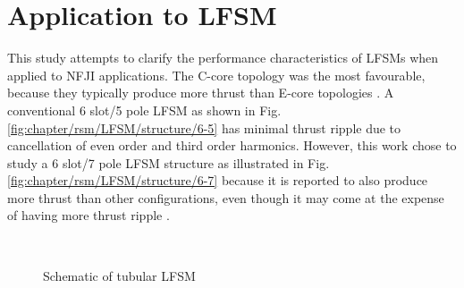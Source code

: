     \section{Application to \ac{LFSM}}               \label{Chapter:RSM/LFSM}
    
    
        This study attempts to clarify the performance characteristics of \acsp{LFSM} when applied to \acs{NFJI} applications. The C-core topology was the most favourable, because they typically produce more thrust than E-core topologies \cite{Min2011OptimizationMachines}. A conventional 6 slot/5 pole \acs{LFSM} as shown in Fig.\,\ref{fig:chapter/rsm/LFSM/structure/6-5} has minimal thrust ripple due to cancellation of even order and third order harmonics. However, this work chose to study a 6 slot/7 pole LFSM structure as illustrated  in Fig.\,\ref{fig:chapter/rsm/LFSM/structure/6-7} because it is reported to also produce more thrust than other configurations, even though it may come at the expense of having more thrust ripple \cite{Chen2010}. 
        
        
        \begin{figure}[!ht]
            \centering
            \\
            \caption{Schematic of tubular \acs{LFSM}
                \label{fig:conventional_flux_switching_machines}
            }\label{fig:chapter/rsm/LFSM/structure}
        \end{figure}
        

